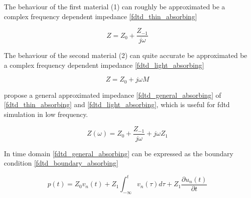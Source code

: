 The behaviour of the first material (1) can roughly be approximated be a complex frequency dependent impedance \autoref{fdtd_thin_absorbing}

\begin{equation}\label{fdtd_thin_absorbing}
Z= Z_0+\frac{Z_{-1}}{j\omega}
\end{equation}

         \startexplain
    \stopexplain

The behaviour of the second material (2) can quite accurate be approximated be a complex frequency dependent impedance \autoref{fdtd_light_absorbing}

\begin{equation}\label{fdtd_light_absorbing}
Z= Z_0+j\omega M
\end{equation}

         \startexplain
    \stopexplain

 \citep{finiteproblems} propose a general approximated impedance \autoref{fdtd_general_absorbing} of \autoref{fdtd_thin_absorbing} and \autoref{fdtd_light_absorbing}, which is useful for \gls{fdtd} simulation in low frequency.

\begin{equation}\label{fdtd_general_absorbing}
Z(\omega)= Z_0+\frac{Z_{-1}}{j\omega}+j\omega Z_1
\end{equation}

         \startexplain
    \stopexplain
    
In time domain \autoref{fdtd_general_absorbing} can be expressed as the boundary condition \autoref{fdtd_boundary_absorbing}

\begin{equation}\label{fdtd_boundary_absorbing}
p(t)= Z_0v_n(t)+Z_1\int_{-\infty}^{t} v_n(\tau)d\tau +Z_1\frac{\partial u_n(t)}{\partial t} 
\end{equation}

         \startexplain
    \stopexplain

